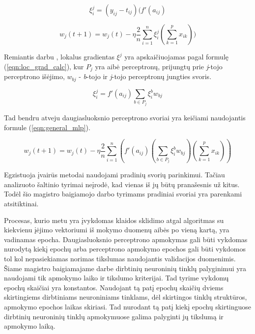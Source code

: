 \begin{equation}
\label{eqn:loc_grad}
	\xi^j_i = (y_{ij} - t_{ij})(f'(a_{ij})
\end{equation}

\begin{equation}
\label{eqn:general_with_loc_grad}
	w_j(t + 1) = w_j(t) - \eta \dfrac{2}{n}\sum_{i = 1}^{n} \xi^j_i(\sum_{k = 1}^{p} x_{ik}))
\end{equation}

Remiantis darbu \cite{feedbackAlg}, lokalus gradientas $\xi^j$ yra apskaičiuojamas pagal formulę (\ref{eqn:loc_grad_calc}), kur $P_j$ yra aibė perceptronų, prijungtų prie \textit{j}-tojo perceptrono išėjimo, $w_{bj}$ - \textit{b}-tojo ir \textit{j}-tojo perceptronų jungties svoris.

\begin{equation}
\label{eqn:loc_grad_calc}
	\xi^j_i = f'(a_{ij})\sum_{b \in P_j}\xi^b_i w_{bj}
\end{equation}

Tad bendru atveju daugiasluoksnio perceptrono svoriai yra keičiami naudojantis formule (\ref{eqn:general_mlp}).

\begin{equation}
\label{eqn:general_mlp}
w_j(t + 1) = w_j(t) - \eta \dfrac{2}{n}\sum_{i = 1}^{n} (f'(a_{ij})(\sum_{b \in P_j}\xi^b_i w_{bj})(\sum_{k = 1}^{p} x_{ik}))
\end{equation}

Egzistuoja įvairūs metodai naudojami pradinių svorių parinkimui. Tačiau analizuoto šaltinio \cite{initNN} tyrimai neįrodė, kad vienas iš jų būtų pranašesnis už kitus. Todėl šio magistro baigiamojo darbo tyrimams pradiniai svoriai yra parenkami atsitiktinai.

Procesas, kurio metu yra įvykdomas klaidos sklidimo atgal algoritmas su kiekvienu įėjimo vektoriumi iš mokymo duomenų aibės po vieną kartą, yra vadinamas epocha. Daugiasluoksnio perceptrono apmokymas gali būti vykdomas nurodytą kiekį epochų arba perceptrono apmokymo epochos gali būti vykdomos tol kol nepasiekiamas norimas tikslumas naudojantis validacijos duomenimis. Šiame magistro baigiamajame darbe dirbtinių neuroninių tinklų palyginimui yra naudojami tik apmokymo laiko ir tikslumo kriterijai. Tad tyrime vykdomų epochų skaičiai yra konstantos. Naudojant tą patį epochų skaičių dviems skirtingiems dirbtiniams neuroniniams tinklams, dėl skirtingos tinklų struktūros, apmokymo epochos laikas skiriasi. Tad nurodant tą patį kiekį epochų skirtinguose dirbtinių neuroninių tinklų apmokymuose galima palyginti jų tikslumą ir apmokymo laiką.

